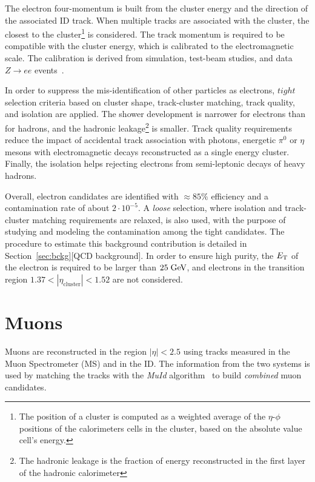 The electron four-momentum is built from the cluster energy
and the direction of the associated ID track.
When multiple tracks are associated with the cluster, the closest
to the cluster\footnote{The position of a cluster 
is computed as a weighted average of the $\eta$-$\phi$ positions 
of the calorimeters cells in the cluster, based on the absolute 
value cell's energy.} is considered.
The track momentum is required to be compatible with the cluster energy,
which is calibrated to the electromagnetic scale. The calibration is
derived from simulation, test-beam studies, and data $Z\to ee$ 
events~\cite{elecalib}.

In order to suppress the mis-identification of other particles  
as electrons, $tight$ selection criteria based on cluster shape, 
track-cluster matching, track quality, and isolation are applied.
The shower development is narrower for electrons than for hadrons, and
the hadronic leakage\footnote{The hadronic leakage is the fraction of 
energy reconstructed in the first layer of the hadronic calorimeter}
is smaller. Track quality requirements reduce the impact of accidental 
track association with photons, energetic $\pi^0$ or $\eta$ mesons
with electromagnetic decays reconstructed as a single energy cluster.
Finally, the isolation helps rejecting electrons from semi-leptonic
decays of  heavy hadrons.

Overall, electron candidates are identified with \mbox{$\approx{}85\%$} 
efficiency and a contamination rate of about \mbox{$2\cdot{}10^{-5}$}.
A {\it loose} selection, where isolation and track-cluster matching
requirements are relaxed, is also used, with the purpose of studying
and modeling the contamination among the tight candidates. 
The procedure to estimate this background
contribution is detailed in Section~\ref{sec:bckg}[QCD background].
In order to ensure high purity, the $\mbox{\ensuremath{E_{\mathrm{T}}}}$ of the electron is required
to be larger than \mbox{$25 \; \mathrm{GeV}{}$}, and electrons in the transition
region $1.37<|\eta_{\mathrm{cluster}}|<1.52$ are not considered.

\section{Muons}
\label{sec:muons}

Muons are reconstructed in the region $|\eta|<2.5$ using tracks
measured in the Muon Spectrometer (MS) and in the ID.
The information from the two systems is used by matching
the tracks with the {\it MuId} algorithm~\cite{muidalgo} to build 
{\it combined} muon candidates.


